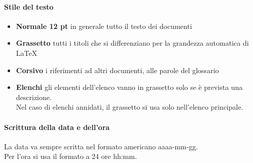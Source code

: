 \paragraph{Stile del testo}
\begin{itemize}
        \item \textbf{Normale 12 pt} in generale tutto il testo dei documenti
        \item \textbf{Grassetto} tutti i titoli che si differenziano per la grandezza automatica di \LaTeX
        \item \textbf{Corsivo} i riferimenti ad altri documenti, alle parole del glossario
        \item \textbf{Elenchi} gli elementi dell'elenco vanno in grassetto solo se è prevista una descrizione. \\
                                Nel caso di elenchi annidati, il grassetto si usa solo nell'elenco principale.
\end{itemize}

\paragraph{Scrittura della data e dell'ora} \hfill \break
La data va sempre scritta nel formato americano aaaa-mm-gg. \\
Per l'ora si usa il formato a 24 ore hh:mm.

